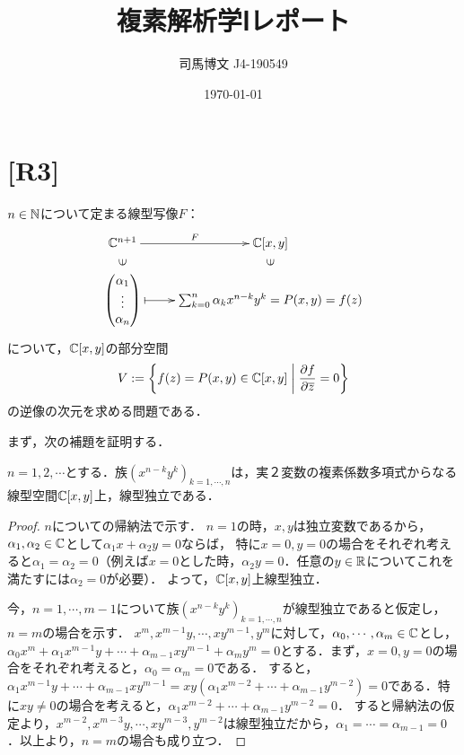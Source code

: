 \documentclass[uplatex, 12pt, dvipdfmx]{jsarticle}
\title{複素解析学Ⅰレポート}
\author{司馬博文 J4-190549}
\date{\today}
\begin{document}
\maketitle

\section*{[R3]}

$n\in\mathbb{N}$について定まる線型写像$F$：
\[\xymatrix@R-2pc{
    \C^{n+1}\ar[r]^-F&{\C[x,y]}\\
    \rotatebox[origin=c]{90}{$\in$}&\rotatebox[origin=c]{90}{$\in$}\\
    {\begin{pmatrix}\alpha_1\\\vdots\\\alpha_n\end{pmatrix}}\ar@{|->}[r]&\sum^n_{k=0}\alpha_kx^{n-k}y^k=P(x,y)=f(z)
}\]
について，$\mathbb{C}[x,y]$の部分空間
\[ V:=\left\{f(z)=P(x,y)\in\mathbb{C}[x,y]\;\middle|\; \frac{\partial f}{\partial\overline{z}}=0\right\} \]
の逆像の次元を求める問題である．

まず，次の補題を証明する．

\begin{lemma*}
    $n=1,2,\cdots$とする．族$(x^{n-k}y^k)_{k=1,\cdots,n}$は，実２変数の複素係数多項式からなる線型空間$\mathbb{C}[x,y]$上，線型独立である．
\end{lemma*}
\begin{proof}
    $n$についての帰納法で示す．
    $n=1$の時，$x,y$は独立変数であるから，$\alpha_1,\alpha_2\in\mathbb{C}$として$\alpha_1x+\alpha_2y=0$ならば，
    特に$x=0,y=0$の場合をそれぞれ考えると$\alpha_1=\alpha_2=0$（例えば$x=0$とした時，$\alpha_2y=0$．任意の$y\in\mathbb{R}$についてこれを満たすには$\alpha_2=0$が必要）．
    よって，$\mathbb{C}[x,y]$上線型独立．

    今，$n=1,\cdots,m-1$について族$(x^{n-k}y^k)_{k=1,\cdots,n}$が線型独立であると仮定し，$n=m$の場合を示す．
    $x^m,x^{m-1}y,\cdots,xy^{m-1},y^m$に対して，$\alpha_0,\cdots,\alpha_{m}\in\mathbb{C}$とし，
    $\alpha_0x^m+\alpha_1x^{m-1}y+\cdots+\alpha_{m-1}xy^{m-1}+\alpha_my^m=0$とする．まず，$x=0,y=0$の場合をそれぞれ考えると，$\alpha_0=\alpha_m=0$である．
    すると，$\alpha_1x^{m-1}y+\cdots+\alpha_{m-1}xy^{m-1}=xy(\alpha_1x^{m-2}+\cdots+\alpha_{m-1}y^{m-2})=0$である．特に$xy\ne 0$の場合を考えると，$\alpha_1x^{m-2}+\cdots+\alpha_{m-1}y^{m-2}=0$．
    すると帰納法の仮定より，$x^{m-2},x^{m-3}y,\cdots,xy^{m-3},y^{m-2}$は線型独立だから，$\alpha_1=\cdots=\alpha_{m-1}=0$．以上より，$n=m$の場合も成り立つ．
\end{proof}
\end{document}
